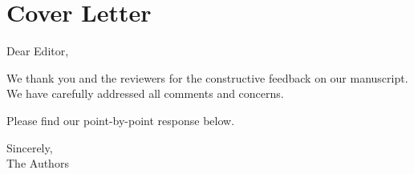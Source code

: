\section*{Cover Letter}

Dear Editor,

We thank you and the reviewers for the constructive feedback on our manuscript.
We have carefully addressed all comments and concerns.

Please find our point-by-point response below.

Sincerely,\\
The Authors

